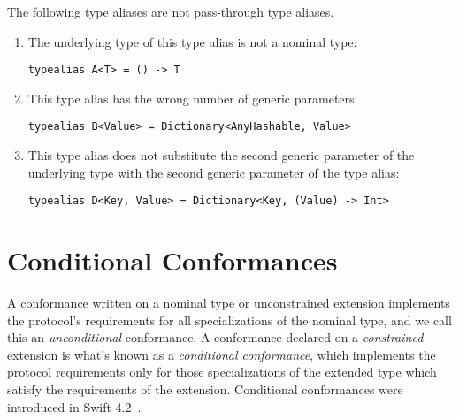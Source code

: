 \documentclass[../generics]{subfiles}
\begin{document}
\begin{example}
The following type aliases are not pass-through type aliases.
\begin{enumerate}
\item The underlying type of this type alias is not a nominal type:
\begin{verbatim}
typealias A<T> = () -> T
\end{verbatim}
\item This type alias has the wrong number of generic parameters:
\begin{verbatim}
typealias B<Value> = Dictionary<AnyHashable, Value>
\end{verbatim}
\item This type alias does not substitute the second generic parameter of the underlying type with the second generic parameter of the type alias:
\begin{verbatim}
typealias D<Key, Value> = Dictionary<Key, (Value) -> Int>
\end{verbatim}
\end{enumerate}
\end{example}

\section{Conditional Conformances}\label{conditional conformance}

A conformance written on a nominal type or unconstrained extension implements the protocol's requirements for all specializations of the nominal type, and we call this an \emph{unconditional} conformance. A conformance declared on a \emph{constrained} extension is what's known as a \emph{conditional conformance}, which implements the protocol requirements only for those specializations of the extended type which satisfy the requirements of the extension. Conditional conformances were introduced in Swift 4.2~\cite{se0143}.
\end{document}
